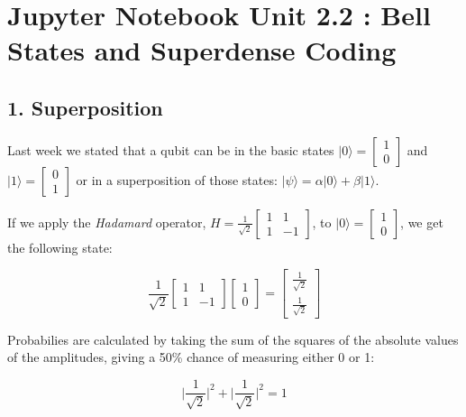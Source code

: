     \hypertarget{unit-2.2-bell-states-and-superdense-coding}{%
\section{Jupyter Notebook Unit 2.2 : Bell States and Superdense
Coding}\label{unit-2.2-bell-states-and-superdense-coding}}

\hypertarget{superposition}{%
\subsection*{1. Superposition}\label{superposition}}

Last week we stated that a qubit can be in the basic states
\(\lvert 0 \rangle = \begin{bmatrix} 1 \\ 0 \end{bmatrix}\) and
\(\lvert 1 \rangle = \begin{bmatrix} 0 \\ 1 \end{bmatrix}\) or in a
superposition of those states:
\(\lvert \psi\rangle = \alpha \lvert 0 \rangle + \beta \lvert 1 \rangle\).

If we apply the \emph{Hadamard} operator,
\(H = \frac{1}{\sqrt{2}} \begin{bmatrix} 1 & 1 \\ 1 & -1 \end{bmatrix}\),
to \(\lvert 0 \rangle = \begin{bmatrix} 1 \\ 0 \end{bmatrix}\), we get
the following state:

\[
\frac{1}{\sqrt{2}} \begin{bmatrix} 1 & 1 \\ 1 & -1 \end{bmatrix} \begin{bmatrix} 1 \\ 0 \end{bmatrix} = \begin{bmatrix} \frac{1}{\sqrt{2}} \\ \frac{1}{\sqrt{2}} \end{bmatrix}
\]

Probabilies are calculated by taking the sum of the squares of the
absolute values of the amplitudes, giving a 50\% chance of measuring
either 0 or 1:

\[
\lvert \frac{1}{\sqrt{2}}\lvert ^2 + \lvert \frac{1}{\sqrt{2}}\lvert ^2 = 1
\]

